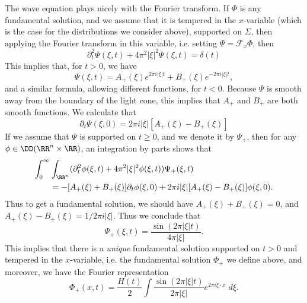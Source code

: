\begin{example}
    The wave equation plays nicely with the Fourier transform. If $\Phi$ is any fundamental solution, and we assume that it is tempered in the $x$-variable (which is the case for the distributions we consider above), supported on $\Sigma$, then applying the Fourier transform in this variable, i.e. setting $\Psi = \mathcal{F}_x \Phi$, then
    \[ \partial_t^2 \Psi(\xi,t) + 4 \pi^2 |\xi|^2 \Psi(\xi,t) = \delta(t) \]
    This implies that, for $t > 0$, we have
    \[ \Psi(\xi,t) = A_+(\xi) e^{2 \pi i |\xi| t} + B_+(\xi) e^{-2 \pi i |\xi| t}, \]
    and a similar formula, allowing different functions, for $t < 0$. Because $\Psi$ is smooth away from the boundary of the light cone, this implies that $A_+$ and $B_+$ are both smooth functions. We calculate that
    \[ \partial_t \Psi(\xi,0) = 2 \pi i |\xi| [A_+(\xi) - B_+(\xi)] \]
    If we assume that $\Psi$ is supported on $t \geq 0$, and we denote it by $\Psi_+$, then for any $\phi \in \DD(\RR^n \times \RR)$, an integration by parts shows that
    \begin{align*}
        \int_0^\infty &\int_{\RR^n} (\partial_t^2 \phi(\xi,t) + 4 \pi^2 |\xi|^2 \phi(\xi,t)) \Psi_+(\xi,t)\\
        &= - [A_+(\xi) + B_+(\xi)] \partial_t \phi(\xi,0) + 2 \pi i |\xi| [A_+(\xi) - B_+(\xi)] \phi(\xi,0).
    \end{align*}
    Thus to get a fundamental solution, we should have $A_+(\xi) + B_+(\xi) = 0$, and $A_+(\xi) - B_+(\xi) = 1 / 2 \pi i |\xi|$. Thus we conclude that
    \[ \Psi_+(\xi,t) = \frac{\sin(2 \pi |\xi| t)}{4 \pi |\xi|}. \]
    This implies that there is a \emph{unique} fundamental solution supported on $t > 0$ and tempered in the $x$-variable, i.e. the fundamental solution $\Phi_+$ we define above, and moreover, we have the Fourier representation
    \[ \Phi_+(x,t) = \frac{H(t)}{2} \int \frac{\sin(2 \pi |\xi| t)}{2 \pi |\xi|} e^{2 \pi i \xi \cdot x}\; d\xi. \]

\end{example}
